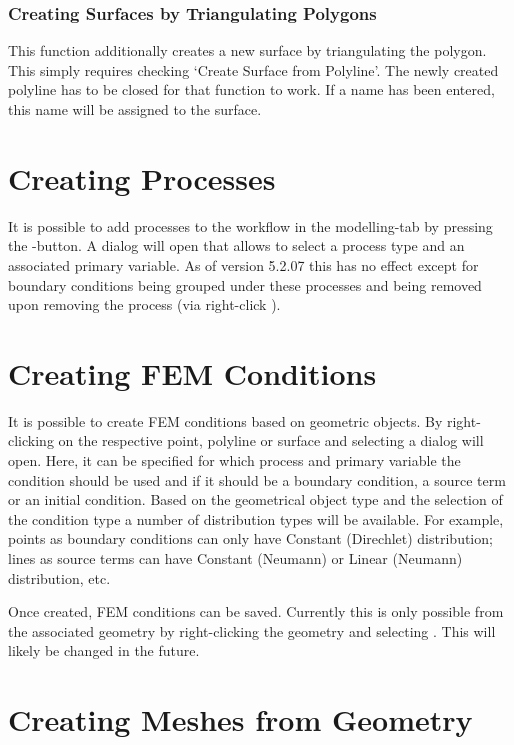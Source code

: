 \subsubsection{Creating Surfaces by Triangulating Polygons}
This function additionally creates a new surface by triangulating the polygon. This simply requires checking `Create Surface from Polyline'. The newly created polyline has to be closed for that function to work. If a name has been entered, this name will be assigned to the surface.

\section{Creating Processes}

It is possible to add processes to the workflow in the modelling-tab by pressing the -button. A dialog will open that allows to select a process type and an associated primary variable. As of version 5.2.07 this has no effect except for boundary conditions being grouped under these processes and being removed upon removing the process (via right-click ).

\section{Creating FEM Conditions}

It is possible to create FEM conditions based on geometric objects. By right-clicking on the respective point, polyline or surface and selecting  a dialog will open. Here, it can be specified for which process and primary variable the condition should be used and if it should be a boundary condition, a source term or an initial condition. Based on the geometrical object type and the selection of the condition type a number of distribution types will be available. For example, points as boundary conditions can only have Constant (Direchlet) distribution; lines as source terms can have Constant (Neumann) or Linear (Neumann) distribution, etc.

Once created, FEM conditions can be saved. Currently this is only possible from the associated geometry by right-clicking the geometry and selecting . This will likely be changed in the future.

\section{Creating Meshes from Geometry}
\label{meshcreation}

